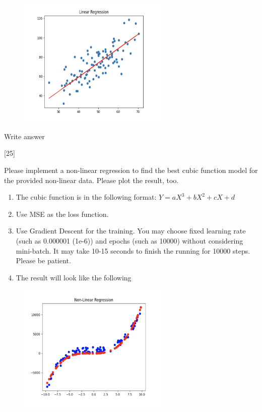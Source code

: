 \documentclass[12pt,letterpaper, onecolumn]{exam}
\begin{document}
\begin{questions}
    \begin{figure}[h]
        \centering
        \includegraphics[width=0.65\textwidth]{linear.png}
    \end{figure}

    \begin{solution}
        Write answer
    \end{solution}

    \pagebreak

    [25]

    Please implement a non-linear regression to find the best cubic function model for the 
    provided non-linear data. Please plot the result, too.

    \begin{enumerate}[label=(\arabic*)]
        \item The cubic function is in the following format: $Y=aX^3+bX^2+cX+d$
        \item Use MSE as the loss function.
        \item Use Gradient Descent for the training. You may choose fixed learning rate (such as
        0.000001 (1e-6)) and epochs (such as 10000) without considering mini-batch. It may take
        10-15 seconds to finish the running for 10000 steps. Please be patient.
        \item The result will look like the following
    \end{enumerate}

    \begin{figure}[h]
        \centering
        \includegraphics[width=0.65\textwidth]{non-linear.png}
    \end{figure}


\end{questions}
\end{document}

